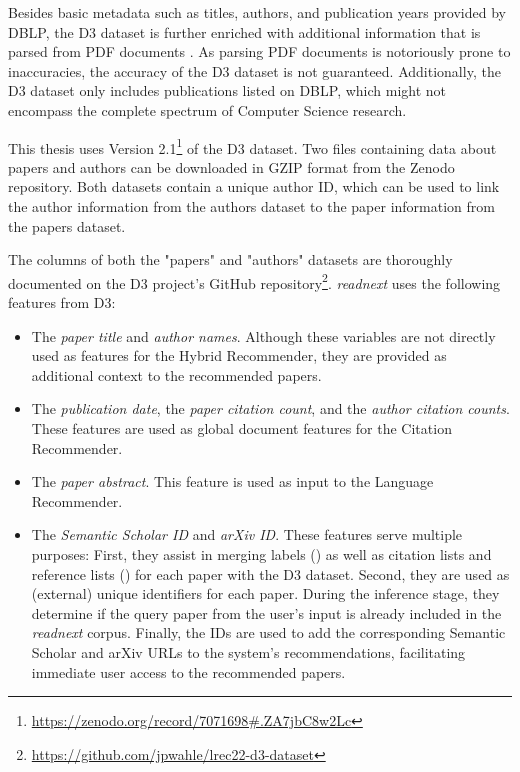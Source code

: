 Besides basic metadata such as titles, authors, and publication years provided by DBLP, the D3 dataset is further enriched with additional information that is parsed from PDF documents \cite{WahleD3Massive2022}.
As parsing PDF documents is notoriously prone to inaccuracies, the accuracy of the D3 dataset is not guaranteed.
Additionally, the D3 dataset only includes publications listed on DBLP, which might not encompass the complete spectrum of Computer Science research.

This thesis uses Version 2.1\footnote{\url{https://zenodo.org/record/7071698\#.ZA7jbC8w2Lc}} of the D3 dataset. Two files containing data about papers and authors can be downloaded in GZIP format from the Zenodo repository. Both datasets contain a unique author ID, which can be used to link the author information from the authors dataset to the paper information from the papers dataset.

The columns of both the "papers" and "authors" datasets are thoroughly documented on the D3 project's GitHub repository\footnote{\url{https://github.com/jpwahle/lrec22-d3-dataset}}. \emph{readnext} uses the following features from D3:

\begin{itemize}
      \item The \emph{paper title} and \emph{author names}. Although these variables are not directly used as features for the Hybrid Recommender, they are provided as additional context to the recommended papers.
      \item The \emph{publication date}, the \emph{paper citation count}, and the \emph{author citation counts}. These features are used as global document features for the Citation Recommender.
      \item The \emph{paper abstract}. This feature is used as input to the Language Recommender.
      \item The \emph{Semantic Scholar ID} and \emph{arXiv ID}.
            These features serve multiple purposes: First, they assist in merging labels () as well as citation lists and reference lists () for each paper with the D3 dataset.
            Second, they are used as (external) unique identifiers for each paper. During the inference stage, they determine if the query paper from the user's input is already included in the \emph{readnext} corpus. Finally, the IDs are used to add the corresponding Semantic Scholar and arXiv URLs to the system's recommendations, facilitating immediate user access to the recommended papers.
\end{itemize}


